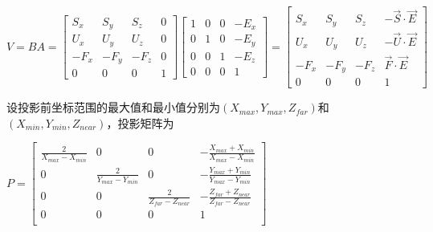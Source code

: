 \documentclass[UTF8]{ctexart}
\begin{document}
$V = BA = \begin{bmatrix} S_x & S_y & S_z & 0 \\
    U_x & U_y & U_z & 0 \\
    -F_x & -F_y & -F_z & 0 \\
    0   &   0 &    0 & 1 

\end{bmatrix} \begin{bmatrix} 1 & 0 & 0 & -E_x \\
    0 & 1 & 0 & -E_y \\
    0 & 0 & 1 & -E_z \\
    0   &   0 &    0 & 1 
\end{bmatrix}
= \begin{bmatrix} S_x & S_y & S_z & -\vec S \cdot \vec E \\
                          U_x & U_y & U_z & -\vec U \cdot \vec E \\
                          -F_x & -F_y & -F_z & \vec F \cdot \vec E \\
                          0 & 0 & 0 & 1
\end{bmatrix}$

\newpage 

设投影前坐标范围的最大值和最小值分别为$(X_{max}, Y_{max}, Z_{far})$和$(X_{min}, Y_{min}, Z_{near})$，投影矩阵为

$P = \begin{bmatrix} 
\frac{2}{X_{max}-X_{min}} & 0 & 0 & -\frac{X_{max}+X_{min}}{X_{max}-X_{min}}\\
0 & \frac{2}{Y_{max}-Y_{min}} & 0 & -\frac{Y_{max}+Y_{min}}{Y_{max}-Y_{min}}\\
0 & 0 & \frac{2}{Z_{far}-Z_{near}} & -\frac{Z_{far}+Z_{near}}{Z_{far}-Z_{near}}\\
0 & 0 & 0 & 1\\ \end{bmatrix}$
\end{document}
